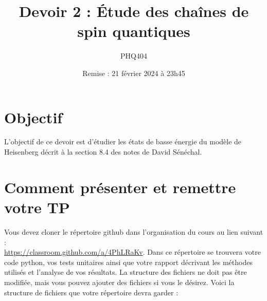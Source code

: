 \documentclass[12pt, letterpaper]{article}
\begin{document}
\title{Devoir 2 : Étude des chaînes de spin quantiques}
\author{PHQ404}
\date{Remise : 21 février 2024 à 23h45}
\maketitle

\section{Objectif}\label{sec:objectif}

\noindent L'objectif de ce devoir est d'étudier les états de basse énergie du modèle
de Heisenberg décrit à la section 8.4 des notes de David Sénéchal.


\section{Comment présenter et remettre votre TP}\label{sec:comment-presenter-et-remettre-votre-tp}

\noindent Vous devez cloner le répertoire github dans l'organisation du cours au lien suivant :\\
\href{https://classroom.github.com/a/4PhLRaKv}{https://classroom.github.com/a/4PhLRaKv}.
Dans ce répertoire se trouvera votre code python, vos tests unitaires ainsi que votre rapport
décrivant les méthodes utilisés et l'analyse de vos résultats.
La structure des fichiers ne doit pas être modifiée, mais vous pouvez ajouter des fichiers si vous le désirez.
Voici la structure de fichiers que votre répertoire devra garder :

\bigskip
\end{document}
